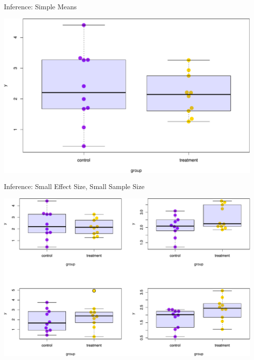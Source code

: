 \documentclass[ignorenonframetext,]{beamer}
\begin{document}
\begin{frame}{Inference: Simple Means}
\protect\hypertarget{inference-simple-means-1}{}

\includegraphics{biostats_I_files/figure-beamer/unnamed-chunk-4-1.pdf}

\end{frame}

\begin{frame}{Inference: Small Effect Size, Small Sample Size}
\protect\hypertarget{inference-small-effect-size-small-sample-size}{}

\includegraphics{biostats_I_files/figure-beamer/unnamed-chunk-5-1.pdf}

\end{frame}
\end{document}
